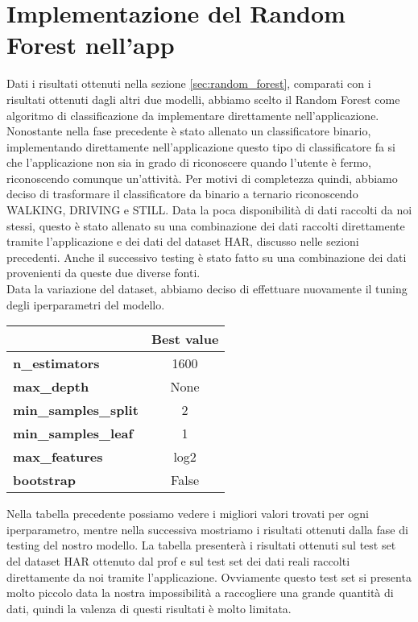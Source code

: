 \documentclass[../../Report.tex]{subfiles}
\begin{document}
\section{Implementazione del Random Forest nell'app}
Dati i risultati ottenuti nella sezione \ref{sec:random_forest}, comparati con i risultati ottenuti dagli altri due modelli, abbiamo scelto il Random Forest come algoritmo di classificazione da implementare direttamente nell'applicazione. Nonostante nella fase precedente è stato allenato un classificatore binario, implementando direttamente nell'applicazione questo tipo di classificatore fa si che l'applicazione non sia in grado di riconoscere quando l'utente è fermo, riconoscendo comunque un'attività. Per motivi di completezza quindi, abbiamo deciso di trasformare il classificatore da binario a ternario riconoscendo WALKING, DRIVING e STILL. Data la poca disponibilità di dati raccolti da noi stessi, questo è stato allenato su una combinazione dei dati raccolti direttamente tramite l'applicazione e dei dati del dataset HAR, discusso nelle sezioni precedenti. Anche il successivo testing è stato fatto su una combinazione dei dati provenienti da queste due diverse fonti.\\
Data la variazione del dataset, abbiamo deciso di effettuare nuovamente il tuning degli iperparametri del modello.

\begin{table}[H]
    \centering
    \begin{tabular}{|l|c|}
        \hline
        & \textbf{Best value} \\
        \hline
        \textbf{n\_estimators} & 1600 \\
        \hline
        \textbf{max\_depth} & None \\
        \hline
        \textbf{min\_samples\_split} & 2 \\
        \hline
        \textbf{min\_samples\_leaf} & 1 \\
        \hline
        \textbf{max\_features} & log2 \\
        \hline
        \textbf{bootstrap} & False \\
        \hline
    \end{tabular}
\end{table}
Nella tabella precedente possiamo vedere i migliori valori trovati per ogni iperparametro, mentre nella successiva mostriamo i risultati ottenuti dalla fase di testing del nostro modello. La tabella presenterà i risultati ottenuti sul test set del dataset HAR ottenuto dal prof e sul test set dei dati reali raccolti direttamente da noi tramite l'applicazione. Ovviamente questo test set si presenta molto piccolo data la nostra impossibilità a raccogliere una grande quantità di dati, quindi la valenza di questi risultati è molto limitata. 
\end{document}
